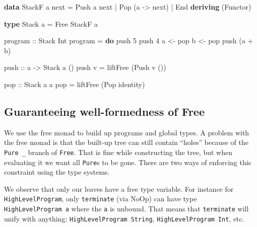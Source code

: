 \documentclass[runningheads,plain]{llncs}
\newenvironment{Shaded}{}{}
\newcommand{\KeywordTok}[1]{\textcolor[rgb]{0.00,0.44,0.13}{\textbf{#1}}}
\newcommand{\DataTypeTok}[1]{\textcolor[rgb]{0.56,0.13,0.00}{#1}}
\newcommand{\DecValTok}[1]{\textcolor[rgb]{0.25,0.63,0.44}{#1}}
\newcommand{\OtherTok}[1]{\textcolor[rgb]{0.00,0.44,0.13}{#1}}
\newcommand{\FunctionTok}[1]{\textcolor[rgb]{0.02,0.16,0.49}{#1}}
\newcommand{\NormalTok}[1]{#1}
\begin{document}
\begin{Shaded}
\begin{Highlighting}[]
\KeywordTok{data} \DataTypeTok{StackF}\NormalTok{ a next }
    \FunctionTok{=} \DataTypeTok{Push}\NormalTok{ a next}
    \FunctionTok{|} \DataTypeTok{Pop}\NormalTok{ (a }\OtherTok{->}\NormalTok{ next)}
    \FunctionTok{|} \DataTypeTok{End} 
    \KeywordTok{deriving}\NormalTok{ (}\DataTypeTok{Functor}\NormalTok{)}

\KeywordTok{type} \DataTypeTok{Stack}\NormalTok{ a }\FunctionTok{=} \DataTypeTok{Free} \DataTypeTok{StackF}\NormalTok{ a}
     
\OtherTok{program ::} \DataTypeTok{Stack} \DataTypeTok{Int}
\NormalTok{program }\FunctionTok{=} \KeywordTok{do} 
\NormalTok{    push }\DecValTok{5} 
\NormalTok{    push }\DecValTok{4} 
\NormalTok{    a }\OtherTok{<-}\NormalTok{ pop}
\NormalTok{    b }\OtherTok{<-}\NormalTok{ pop}
\NormalTok{    push (a }\FunctionTok{+}\NormalTok{ b)}

\OtherTok{push ::}\NormalTok{ a }\OtherTok{->} \DataTypeTok{Stack}\NormalTok{ a ()}
\NormalTok{push v }\FunctionTok{=}\NormalTok{ liftFree (}\DataTypeTok{Push}\NormalTok{ v ()) }

\OtherTok{pop ::} \DataTypeTok{Stack}\NormalTok{ a a }
\NormalTok{pop }\FunctionTok{=}\NormalTok{ liftFree (}\DataTypeTok{Pop}\NormalTok{ identity)}
\end{Highlighting}
\end{Shaded}

\subsection{Guaranteeing well-formedness of
Free}\label{well-formedness-free}

We use the free monad to build up programs and global types. A problem
with the free monad is that the built-up tree can still contain
``holes'' because of the \texttt{Pure\ \_} branch of \texttt{Free}. That
is fine while constructing the tree, but when evaluating it we want all
\texttt{Pure}s to be gone. There are two ways of enforcing this
constraint using the type systems.

We observe that only our leaves have a free type variable. For instance
for \texttt{HighLevelProgram}, only \texttt{terminate} (via NoOp) can
have type \texttt{HighLevelProgram\ a} where the \texttt{a} is unbound.
That means that \texttt{terminate} will unify with anything:
\texttt{HighLevelProgram\ String}, \texttt{HighLevelProgram\ Int}, etc.
\end{document}
